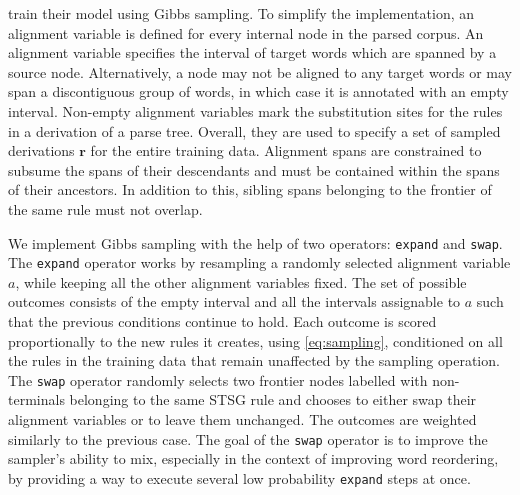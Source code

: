 \documentclass[nofonts]{pbml} %
\begin{document}
\citet{Cohn2009} train their model using Gibbs sampling. To simplify the implementation, an alignment variable is defined for every internal node in the parsed corpus. An alignment variable specifies the interval of target words which are spanned by a source node. Alternatively, a node may not be aligned to any target words or may span a discontiguous group of words, in which case it is annotated with an empty interval. Non-empty alignment variables mark the substitution sites for the rules in a derivation of a parse tree. Overall, they are used to specify a set of sampled derivations $\textbf{r}$ for the entire training data. Alignment spans are constrained to subsume the spans of their descendants and must be contained within the spans of their ancestors. In addition to this, sibling spans belonging to the frontier of the same rule must not overlap.

We implement Gibbs sampling with the help of two operators: \texttt{expand} and \texttt{swap}. The \texttt{expand} operator works by resampling a randomly selected alignment variable $a$, while keeping all the other alignment variables fixed. The set of possible outcomes consists of the empty interval and all the intervals assignable to $a$ such that the previous conditions continue to hold. Each outcome is scored proportionally to the new rules it creates,  using \autoref{eq:sampling}, conditioned on all the rules in the training data that remain unaffected by the sampling operation. The \texttt{swap} operator randomly selects two frontier nodes labelled with non-terminals belonging to the same STSG rule and chooses to either swap their alignment variables or to leave them unchanged. The outcomes are weighted similarly to the previous case. The goal of the \texttt{swap} operator is to improve the sampler's ability to mix, especially in the context of improving word reordering, by providing a way to execute several low probability \texttt{expand} steps at once.
\end{document}
